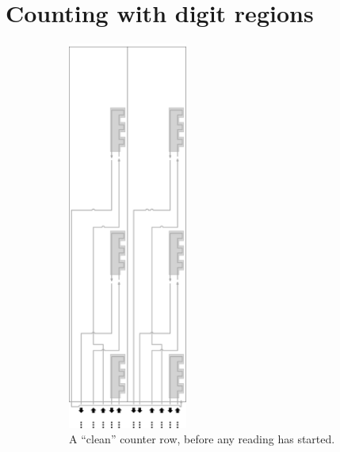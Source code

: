 
\section{Counting with digit regions}


\begin{figure}[H]
    \centering
    \begin{subfigure}[t]{0.43\textwidth}
        \centering
        \includegraphics[width=0.43\textwidth]{counter_read_start_general_case3_middle_level}
        \caption{\label{fig:counter_read_start_case3_middle_level} A ``clean'' counter row, before any reading has started.}
    \end{subfigure}%
    ~
    \begin{subfigure}[t]{0.43\textwidth}
        \centering

\end{subfigure}
\end{figure}
